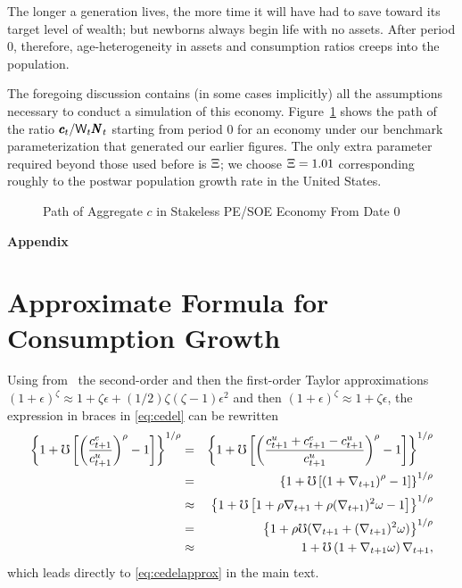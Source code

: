 \documentclass{handout}
\begin{document}
The longer a generation lives, the more time it will have had to save toward
its target level of wealth; but newborns always begin life with no assets.  After period 0, therefore, age-heterogeneity in assets and consumption ratios creeps into the population.

The foregoing discussion contains (in some cases implicitly) all the
assumptions necessary to conduct a simulation of this economy.
Figure~\ref{fig:SOENoStakescPath} shows the path of the ratio $\pmb{c}_{t}/\mathsf{W}_{t}\pmb{N}_{t}$ starting from
period 0 for an economy under our benchmark parameterization that generated
our earlier figures.  The
only extra parameter required beyond those used before is $\Xi$; we choose $\Xi=1.01$ corresponding
roughly to the postwar population growth rate in the United States.

\begin{figure}
\caption{Path of Aggregate $c$ in Stakeless PE/SOE Economy From Date 0}
\label{fig:SOENoStakescPath}
\end{figure}



\label{sec:PFwhenFHWfails}
\pagebreak\appendix
\centerline{\bf \LARGE Appendix}\medskip

\setcounter{section}{0}

\section{Approximate Formula for Consumption Growth}\label{sec:CGroApprox}

Using from \MathFactsList ~the second-order and then the first-order
Taylor approximations  \TaylorTwo $(1+\epsilon)^{\zeta} \approx 1 + \zeta \epsilon +
(1/2)\zeta(\zeta-1) \epsilon^{2}$ and then \TaylorOne $(1+\epsilon)^{\zeta} \approx 1 + \zeta \epsilon$, the expression in braces
in \eqref{eq:cedel} can be rewritten
\begin{eqnarray}
        \left\{1+\mho\left[\left(\frac{c^{e}_{t+1}}{c^{u}_{t+1}}\right)^{\rho}-1\right]\right\}^{1/\rho} & = & \left\{1+\mho\left[\left(\frac{c^{u}_{t+1}+c^{e}_{t+1}-c^{u}_{t+1}}{c^{u}_{t+1}}\right)^{\rho}-1\right]\right\}^{1/\rho} \notag
\\      & = & \left\{1+\mho\left[\left(1+\nabla _{t+1}\right)^{\rho}-1\right]\right\}^{1/\rho} \notag
\\      & \approx &      \left\{1+\mho\left[1+\rho \nabla _{t+1}+ \rho (\nabla _{t+1})^{2}\omega-1\right]\right\}^{1/\rho} \notag 
\\ & = &         \left\{1+ \rho \mho (\nabla _{t+1}+ (\nabla _{t+1})^{2}\omega)\right\}^{1/\rho} \notag
\\ & \approx & 1+ \mho  \left(1+\nabla _{t+1}\omega\right)\nabla _{t+1}, \notag
\end{eqnarray}
which leads directly to \eqref{eq:cedelapprox} in the main text.
\end{document}
